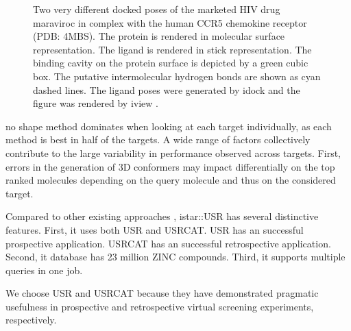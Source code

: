\begin{figure}
\centering
{}
\caption{Two very different docked poses of the marketed HIV drug maraviroc in complex with the human CCR5 chemokine receptor (PDB: 4MBS). The protein is rendered in molecular surface representation. The ligand is rendered in stick representation. The binding cavity on the protein surface is depicted by a green cubic box. The putative intermolecular hydrogen bonds are shown as cyan dashed lines. The ligand poses were generated by idock \citep{1153} and the figure was rendered by iview \citep{1366}.}
\label{usr:MRV}
\end{figure}

\citep{1332} no shape method dominates when looking at each target individually, as each method is best in half of the targets. A wide range of factors collectively contribute to the large variability in performance observed across targets. First, errors in the generation of 3D conformers may impact differentially on the top ranked molecules depending on the query molecule and thus on the considered target.

Compared to other existing approaches \citep{1333,1334,1335,1337,1338,1331}, istar::USR has several distinctive features. First, it uses both USR and USRCAT. USR has an successful prospective application. USRCAT has an successful retrospective application. Second, it database has 23 million ZINC compounds. Third, it supports multiple queries in one job.

We choose USR \citep{1379} and USRCAT \citep{1331} because they have demonstrated pragmatic usefulness in prospective and retrospective virtual screening experiments, respectively.

